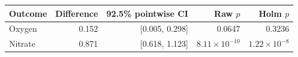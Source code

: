 \begin{tabular}{lrrrr}
\toprule
Outcome & Difference & 92.5\% pointwise CI & Raw $p$ & Holm $p$ \\
\midrule
Oxygen & 0.152 & [0.005, 0.298] & 0.0647 & 0.3236 \\
Nitrate & 0.871 & [0.618, 1.123] & $8.11\times10^{-10}$ & $1.22\times10^{-8}$ \\
\bottomrule
\end{tabular}
